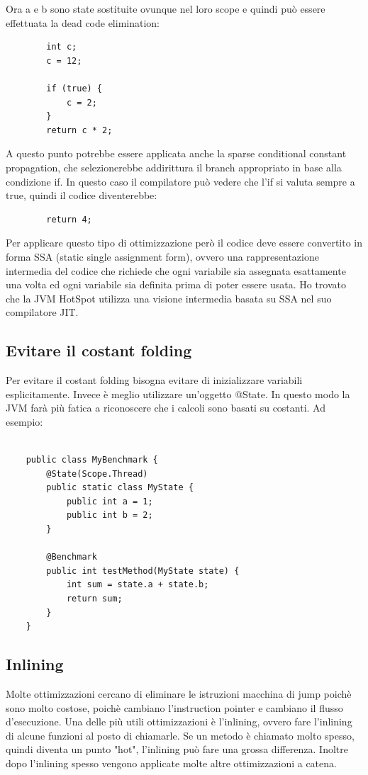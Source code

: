 \documentclass[a4paper, 11pt,            %
openright,               %
italian,
english                 
]{article}       %
\begin{document}
	Ora a e b sono state sostituite ovunque nel loro scope e quindi può essere effettuata la dead code elimination:
	
	\begin{lstlisting}
		int c;
		c = 12;
		
		if (true) {
			c = 2;
		}
		return c * 2;
	\end{lstlisting}
	
	A questo punto potrebbe essere applicata anche la sparse conditional constant propagation, che selezionerebbe addirittura il branch appropriato in base alla condizione if. In questo caso il compilatore può vedere che l'if si valuta sempre a true, quindi il codice diventerebbe:
	
	\begin{lstlisting}
		return 4;
	\end{lstlisting}
	
	Per applicare questo tipo di ottimizzazione però il codice deve essere convertito in forma SSA (static single assignment form), ovvero una rappresentazione intermedia del codice che richiede che ogni variabile sia assegnata esattamente una volta ed ogni variabile sia definita prima di poter essere usata. Ho trovato che la JVM HotSpot utilizza una visione intermedia basata su SSA nel suo compilatore JIT.
	
	\subsection{Evitare il costant folding}
	
	Per evitare il costant folding bisogna evitare di inizializzare variabili esplicitamente. Invece è meglio utilizzare un'oggetto @State. In questo modo la JVM farà più fatica a riconoscere che i calcoli sono basati su costanti. Ad esempio:
	
	\begin{lstlisting}
	
	public class MyBenchmark {
		@State(Scope.Thread)
		public static class MyState {
			public int a = 1;
			public int b = 2;
		}
		
		@Benchmark 
		public int testMethod(MyState state) {
			int sum = state.a + state.b;
			return sum;
		}
	}
	\end{lstlisting}
	
	
	\subsection{Inlining}
	
	Molte ottimizzazioni cercano di eliminare le istruzioni macchina di jump poichè sono molto costose, poichè cambiano l'instruction pointer e cambiano il flusso d'esecuzione. Una delle più utili ottimizzazioni è l'inlining, ovvero fare l'inlining di alcune funzioni al posto di chiamarle. Se un metodo è chiamato molto spesso, quindi diventa un punto "hot", l'inlining può fare una grossa differenza. Inoltre dopo l'inlining spesso vengono applicate molte altre ottimizzazioni a catena. 
	
\end{document}
